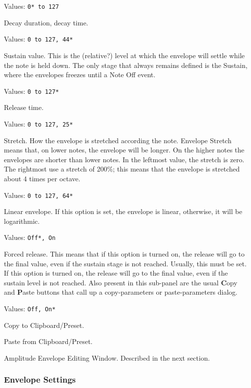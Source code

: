    Values: \texttt{0* to 127}

   Decay duration, decay time.

   Values: \texttt{0 to 127, 44*}

   Sustain value.
   This is the (relative?) level at which the envelope will settle
   while the note is held down.
   The only stage that always remains defined is the Sustain, where the
   envelopes freezes until a Note Off event.

   Values: \texttt{0 to 127*}

   Release time.

   Values: \texttt{0 to 127, 25*}

   Stretch.
   How the envelope is stretched according the note.
   Envelope Stretch means that, on lower notes, the envelope will be longer.
   On the higher notes the envelopes are shorter than lower notes. In the
   leftmost value, the stretch is zero. The rightmost use a stretch of 200\%;
   this means that the envelope is stretched about 4 times per octave.

   Values: \texttt{0 to 127, 64*}

   Linear envelope.
   If this option is set, the envelope is linear, otherwise, it will be
   logarithmic.

   Values: \texttt{Off*, On}

   Forced release.
   This means that if this option is turned on, the release will go to the
   final value, even if the sustain stage is not reached. Usually, this must
   be set.
   If this option is turned on, the release will go to the
   final value, even if the sustain level is not reached.
   Also present in this sub-panel are the usual \textbf{C}opy
   and \textbf{P}aste buttons that call up a copy-parameters or
   paste-parameters dialog.

   Values: \texttt{Off, On*}

   Copy to Clipboard/Preset.

   Paste from Clipboard/Preset.

   Amplitude Envelope Editing Window.
   Described in the next section.

\subsubsection{Envelope Settings}
\label{subsubsec:envelope_settings}

